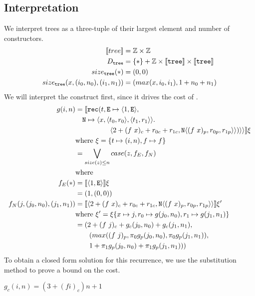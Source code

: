 \subsection{Interpretation}
%
We interpret trees as a three-tuple of their largest element and number of
 constructors.
%
\begin{align*}
  \llbracket tree \rrbracket &= \mathbb{Z} \times \mathbb{Z} \\
  D_{\texttt{tree}} &= \{\ast\} + \mathbb{Z} \times \llbracket \texttt{tree} \rrbracket \times \llbracket \texttt{tree} \rrbracket \\
  size_{\texttt{tree}}(\ast) &= (0, 0) \\
  size_{\texttt{tree}}(x, (i_0, n_0), (i_1, n_1)) &= (max(x, i_0, i_1), 1 + n_0 + n_1)
\end{align*}
%
We will interpret the  construct first, since it drives the cost of
.
%
\begin{align*}
  g(i,n) &= \LB\T{rec}(t, \T{E} \mapsto \LP 1,\T{E}\RP, \\
         &\quad \T{N} \mapsto \LP x,\LP t_0,r_0\RP,\LP t_1,r_1\RP\RP. \\
         &\quadfive \LP 2 + (f\ x)_c + r_{0c} + r_{1c}, \T{N}\LP (f\ x)_p,r_{0p},r_{1p}\RP\RP)\RP\RP\RB \xi\\
         &\text{where } \xi = \{t \mapsto (i,n), f \mapsto f \} \\
         &= \bigvee\limits_{size(z) \leq n} case(z, f_E, f_N) \\
         &\text{where} \\
  f_E(\ast) &= \LB \LP 1,\T{E}\RP\RB\xi  \\
            &= (1,(0,0)) \\
  f_N(j,(j_0, n_0),(j_1,n_1)) &= \LB \LP 2 + (f\ x)_c + r_{0c} + r_{1c}, \T{N}\LP (f\ x)_p,r_{0p},r_{1p}\RP\RP \RB \xi' \\
         &\text{where } \xi' = \xi \{ x \mapsto j, r_0 \mapsto g(j_0,n_0), r_1 \mapsto g(j_1,n_1) \} \\
         &= (2 + (f\ j)_c + g_c(j_0,n_0) + g_c(j_1,n_1), \\
         &\qquad (max((f\ j)_p, \pi_0g_p(j_0,n_0), \pi_0g_p(j_1,n_1)), \\
         &\qquad 1 + \pi_1g_p(j_0,n_0) + \pi_1g_p(j_1,n_1)))
\end{align*}
%
To obtain a closed form solution for this recurrence, we use the substitution
method to prove a bound on the cost.
%
\begin{lemma}
  $g_c(i,n) = (3 + (f i)_c)n + 1$
\end{lemma}
%
